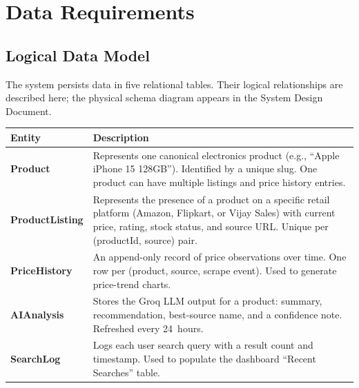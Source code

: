 \documentclass[12pt,a4paper]{report}
\begin{document}
\chapter{Data Requirements}

\section{Logical Data Model}
The system persists data in five relational tables. Their logical relationships
are described here; the physical schema diagram appears in the System Design
Document.

\begin{longtable}{L{3cm} L{10cm}}
  \toprule
  \textbf{Entity} & \textbf{Description} \\
  \midrule
  \endhead
  \textbf{Product} &
    Represents one canonical electronics product (e.g., ``Apple iPhone 15 128GB'').
    Identified by a unique slug. One product can have multiple listings and
    price history entries. \\[3pt]
  \textbf{ProductListing} &
    Represents the presence of a product on a specific retail platform
    (Amazon, Flipkart, or Vijay Sales) with current price, rating, stock
    status, and source URL. Unique per (productId, source) pair. \\[3pt]
  \textbf{PriceHistory} &
    An append-only record of price observations over time. One row per
    (product, source, scrape event). Used to generate price-trend charts. \\[3pt]
  \textbf{AIAnalysis} &
    Stores the Groq LLM output for a product: summary, recommendation,
    best-source name, and a confidence note. Refreshed every 24~hours. \\[3pt]
  \textbf{SearchLog} &
    Logs each user search query with a result count and timestamp.
    Used to populate the dashboard ``Recent Searches'' table. \\
  \bottomrule
\end{longtable}
\end{document}
